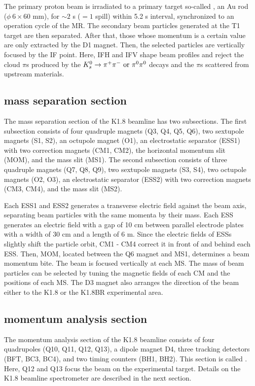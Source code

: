 The primary proton beam is irradiated to a primary target so-called , an Au rod ($\phi\ 6\times60$ mm), for $\sim2$ s ($=1$ spill) within 5.2 s interval, synchronized to an operation cycle of the MR. The secondary beam particles generated at the T1 target are then separated. After that, those whose momentum is a certain value are only extracted by the D1 magnet. Then, the selected particles are vertically focused by the IF point. Here, IFH and IFV shape beam profiles and reject the cloud $\pi$s produced by the $K^0_s \to \pi^+ \pi^-\ \rm{or}\ \pi^0 \pi^0$ decays and the $\pi$s scattered from upstream materials.

\subsection{mass separation section}
The mass separation section of the K1.8 beamline has two subsections. The first subsection consists of four quadruple magnets (Q3, Q4, Q5, Q6), two sextupole magnets (S1, S2), an octupole magnet (O1), an electrostatic separator (ESS1) with two correction magnets (CM1, CM2), the horizontal momentum slit (MOM), and the mass slit (MS1). The second subsection consists of three quadruple magnets (Q7, Q8, Q9), two sextupole magnets (S3, S4), two octupole magnets (O2, O3), an electrostatic separator (ESS2) with two correction magnets (CM3, CM4), and the mass slit (MS2). 

Each ESS1 and ESS2 generates a transverse electric field against the beam axis, separating beam particles with the same momenta by their mass. Each ESS generates an electric field with a gap of 10 cm between parallel electrode plates with a width of 30 cm and a length of 6 m. Since the electric fields of ESSs slightly shift the particle orbit, CM1 - CM4 correct it in front of and behind each ESS. Then, MOM, located between the Q6 magnet and MS1, determines a beam momentum bite. The beam is focused vertically at each MS. The mass of beam particles can be selected by tuning the magnetic fields of each CM and the positions of each MS. The D3 magnet also arranges the direction of the beam either to the K1.8 or the K1.8BR experimental area. 

\subsection{momentum analysis section}
The momentum analysis section of the K1.8 beamline consists of four quadrupoles (Q10, Q11, Q12, Q13), a dipole magnet D4, three tracking detectors (BFT, BC3, BC4), and two timing counters (BH1, BH2). This section is called . Here, Q12 and Q13 focus the beam on the experimental target. Details on the K1.8 beamline spectrometer are described in the next section.


